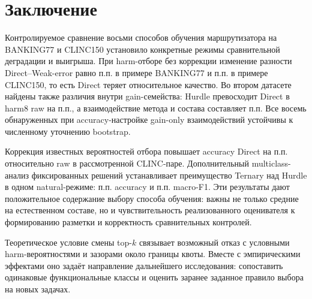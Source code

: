 \section{Заключение}
Контролируемое сравнение восьми способов обучения маршрутизатора
на BANKING77 и CLINC150 установило конкретные режимы сравнительной
деградации и выигрыша. При harm-отборе без коррекции изменение
разности Direct--Weak-error равно \BankShiftEffect{} п.п.
в примере BANKING77 и \ClincShiftEffect{} п.п. в примере
CLINC150, то есть Direct теряет относительное качество.
Во втором датасете найдены также различия внутри
gain-семейства: Hurdle превосходит Direct в harm8 raw на
\HurdleSimpleEffect{} п.п., а взаимодействие метода и состава
составляет \HurdleShiftEffect{} п.п. Все восемь обнаруженных
при accuracy-настройке gain-only взаимодействий устойчивы
к численному уточнению bootstrap.

Коррекция известных вероятностей отбора повышает accuracy Direct
на \CorrectionEffect{} п.п. относительно raw в рассмотренной
CLINC-паре. Дополнительный multiclass-анализ фиксированных решений
устанавливает преимущество Ternary над Hurdle в одном natural-режиме:
\NaturalAccuracyEffect{} п.п. accuracy и \NaturalFoneEffect{} п.п.
macro-F1. Эти результаты дают положительное содержание выбору
способа обучения: важны не только средние на естественном составе,
но и чувствительность реализованного оценивателя к формированию
разметки и корректность сравнительных контролей.

Теоретическое условие смены top-$k$ связывает возможный отказ
с условными harm-вероятностями и зазорами около границы квоты.
Вместе с эмпирическими эффектами оно задаёт направление дальнейшего
исследования: сопоставить одинаковые функциональные классы
и оценить заранее заданное правило выбора на новых задачах.

